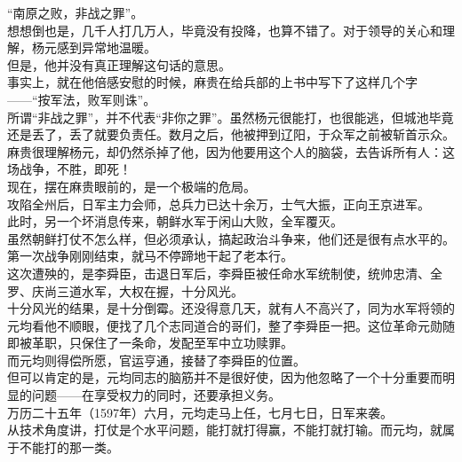 \begin{multicols}{\theparacolNo}
“南原之败，非战之罪”。\\

想想倒也是，几千人打几万人，毕竟没有投降，也算不错了。对于领导的关心和理解，杨元感到异常地温暖。\\

但是，他并没有真正理解这句话的意思。\\

事实上，就在他倍感安慰的时候，麻贵在给兵部的上书中写下了这样几个字——“按军法，败军则诛”。\\

所谓“非战之罪”，并不代表“非你之罪”。虽然杨元很能打，也很能逃，但城池毕竟还是丢了，丢了就要负责任。数月之后，他被押到辽阳，于众军之前被斩首示众。\\

麻贵很理解杨元，却仍然杀掉了他，因为他要用这个人的脑袋，去告诉所有人：这场战争，不胜，即死！\\

现在，摆在麻贵眼前的，是一个极端的危局。\\

攻陷全州后，日军主力会师，总兵力已达十余万，士气大振，正向王京进军。\\

此时，另一个坏消息传来，朝鲜水军于闲山大败，全军覆灭。\\

虽然朝鲜打仗不怎么样，但必须承认，搞起政治斗争来，他们还是很有点水平的。第一次战争刚刚结束，就马不停蹄地干起了老本行。\\

这次遭殃的，是李舜臣，击退日军后，李舜臣被任命水军统制使，统帅忠清、全罗、庆尚三道水军，大权在握，十分风光。\\

十分风光的结果，是十分倒霉。还没得意几天，就有人不高兴了，同为水军将领的元均看他不顺眼，便找了几个志同道合的哥们，整了李舜臣一把。这位革命元勋随即被革职，只保住了一条命，发配至军中立功赎罪。\\

而元均则得偿所愿，官运亨通，接替了李舜臣的位置。\\

但可以肯定的是，元均同志的脑筋并不是很好使，因为他忽略了一个十分重要而明显的问题——在享受权力的同时，还要承担义务。\\

万历二十五年（1597年）六月，元均走马上任，七月七日，日军来袭。\\

从技术角度讲，打仗是个水平问题，能打就打得赢，不能打就打输。而元均，就属于不能打的那一类。\\


\end{multicols}
